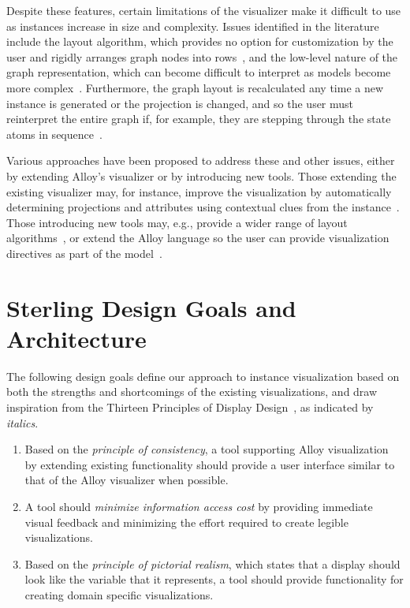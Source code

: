 \documentclass[runningheads]{llncs}
\begin{document}
Despite these features, certain limitations of the visualizer make it difficult to use as instances increase in size and complexity. 
Issues identified in the literature include the layout algorithm, which provides no option for customization by the user and rigidly arranges graph nodes into rows~\cite{couto2018,macedo2019}, and the low-level nature of the graph representation, which can become difficult to interpret as models become more complex~\cite{gammaitoni2014}. 
Furthermore, the graph layout is recalculated any time a new instance is generated or the projection is changed, and so the user must reinterpret the entire graph if, for example, they are stepping through the state atoms in sequence~\cite{couto2018,misue1995,zaman2013}.


Various approaches have been proposed to address these and other issues, either by extending Alloy's visualizer or by introducing new tools. Those extending the existing visualizer may, for instance, improve the visualization by automatically determining projections and attributes using contextual clues from the instance~\cite{zaman2013}. Those introducing new tools may, e.g., provide a wider range of layout algorithms~\cite{couto2018,macedo2019}, or extend the Alloy language so the user can provide visualization directives as part of the model~\cite{gammaitoni2014}.

\section{Sterling Design Goals and Architecture}
\label{sterling}

The following design goals define our approach to instance visualization based on both the strengths and shortcomings of the existing visualizations, and draw inspiration from the Thirteen Principles of Display Design~\cite{}, as indicated by \emph{italics}.

\begin{enumerate}
    \item \label{dg1} Based on the \emph{principle of consistency}, a tool supporting Alloy visualization by extending existing functionality should provide a user interface similar to that of the Alloy visualizer when possible.
    \item \label{dg2} A tool should \emph{minimize information access cost} by providing immediate visual feedback and minimizing the effort required to create legible visualizations.
    \item \label{dg3} Based on the \emph{principle of pictorial realism}, which states that a display should look like the variable that it represents, a tool should provide functionality for creating domain specific visualizations.
\end{enumerate}
\end{document}
